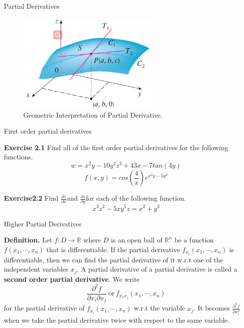 \documentclass[aspectratio=169, UTF8]{ctexbeamer}
\begin{document}
    \begin{frame}[t]{Partial Derivatives}
        \begin{figure}
            \centering 
            \includegraphics[width = 7cm]{f9.png}
            \caption{Geometric Interpretation of Partial Derivative.}
        \end{figure}
    \end{frame}
    
    \begin{frame}[t]{First order partial derivatives}
        \par \textbf{Exercise 2.1}  Find all of the first order partial derivatives for the following functions.
        \begin{equation*}
            w = x^2y - 10y^2z^3 + 43x - 7tan(4y)
        \end{equation*}
        \begin{equation*}
             f(x,y) = cos(\frac{4}{x})e^{x^2y-5y^3}
        \end{equation*}
        \par \textbf{Exercise2.2} Find $\frac{\partial z}{\partial x}$and $\frac{\partial z}{\partial y}$for each of the following function.
        \begin{equation*}
            x^3z^2 - 5xy^5z = x^2 + y^3
        \end{equation*}
           
    \end{frame}

    \begin{frame}[t]{Higher Partial Derivatives}
        \begin{block}
            \par \textbf{Definition.} Let $f: D \to \mathbb{R}$ where $D$ is an open ball of $\mathbb{R}^n$ be a function $f(x_1,\cdots, x_n)$ that is differentiable. If the partial derivative $f_{x_i} (x_1, \cdots, x_n)$ is differentiable, then we can find the partial derivative of it w.r.t one of the independent variables $x_j$. A partial derivative of a partial derivative is called a \textbf{second order  partial derivative}. We write 
            \begin{equation*}
                \dfrac{\partial^2 f}{\partial x_i \partial x_j} \ \text{or} \ f_{x_1x_j} (x_1, \cdots, x_n)
            \end{equation*}
            for the partial derivative of $f_{x_i} (x_1, \cdots, x_n)$ w.r.t the variable $x_j$. It becomes $\frac{\partial^2 f}{\partial x_i^2}$ when we take the partial derivative twice with respect to the same variable. 
        \end{block}
    \end{frame}
    
\end{document}
